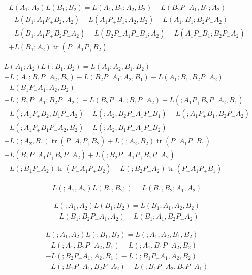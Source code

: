 \documentclass[b5paper,draft,openbib,12pt]{memoir}
\DeclareMathOperator{\tr}{tr}
\begin{document}
\begin{multline}
L(A_1;A_2)L(B_1;B_2)=L(A_1,B_1;A_2,B_2) - L(B_2P_-A_1,B_1;A_2)\\
-L(B_1;A_1P_+B_2,A_2) -L(A_1P_+B_1;A_2,B_2)-L(A_1,B_1;B_2P_-A_2)\\
-L(B_1;A_1P_+B_2P_-A_2) - L(B_2P_-A_1P_+B_1;A_2)-L(A_1P_+B_1;B_2P_-A_2)\\
+L(B_1;A_2)\tr(P_-A_1P_+B_2)
\end{multline}

\begin{multline}
L(A_1;A_2)L(;B_1,B_2)= L(A_1;A_2,B_1,B_2)\\
-L(A_1;B_1P_-A_2,B_2)-L(B_2P_-A_1;A_2,B_1) -L(A_1;B_1,B_2P_-A_2)\\
-L(B_1P_-A_1;A_2,B_2)\\
-L(B_1P_-A_1;B_2P_-A_2)-L(B_2P_-A_1;B_1P_-A_2)-L(;A_1P_+B_2P_-A_2,B_1)\\
-L(;A_1P_+B_2,B_1P_-A_2) - L(;A_2,B_2P_-A_1P_+B_1) - L(;A_1P_+B_1,B_2P_-A_2)\\
-L(;A_1P_+B_1P_-A_2,B_2)-L(;A_2,B_1P_-A_1P_+B_2) \\
+L(;A_2,B_1) \tr (P_-A_1P_+B_2) + L(;A_2,B_2) \tr(P_-A_1P_+B_1)\\
+L(B_1P_-A_1P_+B_2P_-A_2) + L(;B_2P_-A_1P_+B_1P_-A_2)\\
-L(;B_1P_-A_2)\tr(P_-A_1P_+B_2) - L(;B_2P_-A_2) \tr(P_-A_1P_+B_1)
\end{multline}

\begin{multline}
L(;A_1,A_2)L(B_1,B_2;)=L(B_1,B_2;A_1,A_2)
\end{multline}

\begin{multline}
L(;A_1,A_2)L(B_1;B_2)=L(B_1;A_1,A_2,B_2)\\
-L(B_1;B_2P_-A_1,A_2)-L(B_1;A_1,B_2P_-A_2)
\end{multline}

\begin{multline}
L(;A_1,A_2)L(;B_1,B_2)= L(;A_1,A_2,B_1,B_2) \\
- L(;A_1,B_2P_-A_2,B_1)-L(;A_1,B_1P_-A_2,B_2) \\
-L(;B_2P_-A_1,A_2,B_1)-L(;B_1P_-A_1,A_2,B_2)\\
-L(;B_1P_-A_1,B_2P_-A_2)-L(;B_1P_-A_2,B_2P_-A_1)
\end{multline}



\backmatter
\end{document}
